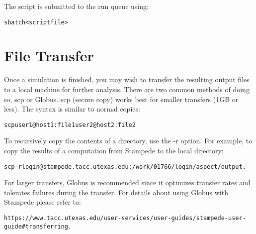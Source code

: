 \documentclass[12pt]{article}
\begin{document}
The script is submitted to the run queue using: \\
 
 \begin{alltt}\footnotesize
sbatch <script file> 
  \end{alltt}

\section{File Transfer}
Once a simulation is finished, you may wish to transfer the resulting output files to a local machine for further analysis. There are two common methods of doing so, scp or Globus. scp (secure copy) works best for smaller transfers (1GB or less). The syntax is similar to normal copies: \\

 \begin{alltt}\footnotesize
scp user1@host1:file1 user2@host2:file2 
  \end{alltt}

To recursively copy the contents of a directory, use the -r option. For example, to copy the results of a computation from Stampede to the local directory: 

 \begin{alltt}\footnotesize
scp -r login@stampede.tacc.utexas.edu:/work/01766/login/aspect/output . 
  \end{alltt}

For larger transfers, Globus is recommended since it optimizes transfer rates and tolerates
failures during the transfer. For details about using Globus with Stampede please refer to: 

 \begin{alltt}\footnotesize
https://www.tacc.utexas.edu/user-services/user-guides/stampede-user-guide\#transferring.
  \end{alltt}
 

 
\end{document}
